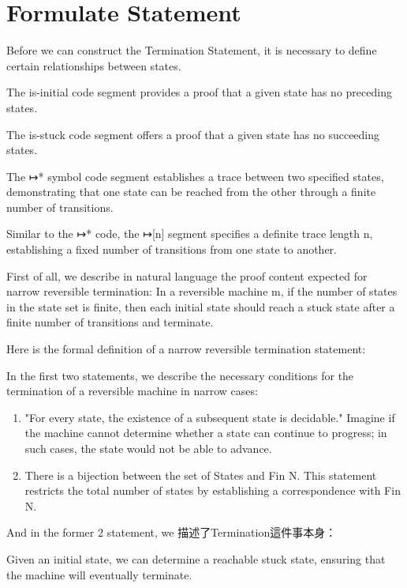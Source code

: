 \section{Formulate Statement}

Before we can construct the Termination Statement, it is necessary to define certain relationships between states.


The is-initial code segment provides a proof that a given state has no preceding states.


The is-stuck code segment offers a proof that a given state has no succeeding states.


The ↦* symbol code segment establishes a trace between two specified states, demonstrating that one state can be reached from the other through a finite number of transitions.


Similar to the ↦* code, the ↦[n] segment specifies a definite trace length n, establishing a fixed number of transitions from one state to another.

First of all, we describe in natural language the proof content expected for narrow reversible termination:
In a reversible machine m, if the number of states in the state set is finite, then each initial state should reach a stuck state after a finite number of transitions and terminate.

Here is the formal definition of a narrow reversible termination statement:



In the first two statements, we describe the necessary conditions for the termination of a reversible machine in narrow cases:

\begin{enumerate}[1.]
\item "For every state, the existence of a subsequent state is decidable." Imagine if the machine cannot determine whether a state can continue to progress; in such cases, the state would not be able to advance.
\item There is a bijection between the set of States and Fin N. This statement restricts the total number of states by establishing a correspondence with Fin N.
\end{enumerate}

And in the former 2 statement, we 描述了Termination這件事本身：

Given an initial state, we can determine a reachable stuck state, ensuring that the machine will eventually terminate.






